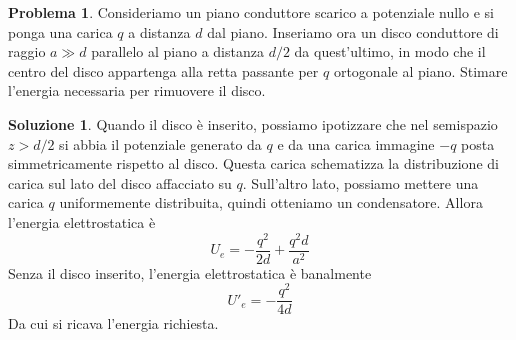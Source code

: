\documentclass[a4paper,11pt]{book}
\theoremstyle{theorem}
\theoremstyle{definition}
\newtheorem{problema}{Problema}[section]
\newtheorem{soluzione}{Soluzione}[section]
\begin{document}
\begin{problema}
	Consideriamo un piano conduttore scarico a potenziale nullo e si ponga una carica $q$ a distanza $d$ dal piano. Inseriamo ora un disco conduttore di raggio $a\gg d$ parallelo al piano a distanza $d/2$ da quest'ultimo, in modo che il centro del disco appartenga alla retta passante per $q$ ortogonale al piano. Stimare l'energia necessaria per rimuovere il disco.
\end{problema}
\begin{soluzione}
	Quando il disco è inserito, possiamo ipotizzare che nel semispazio $z>d/2$ si abbia il potenziale generato da $q$ e da una carica immagine $-q$ posta simmetricamente rispetto al disco. Questa carica schematizza la distribuzione di carica sul lato del disco affacciato su $q$. Sull'altro lato, possiamo mettere una carica $q$ uniformemente distribuita, quindi otteniamo un condensatore. Allora l'energia elettrostatica è
	\[U_e=-\frac{q^2}{2d}+\frac{q^2d}{a^2}\]
	Senza il disco inserito, l'energia elettrostatica è banalmente
	\[U'_e=-\frac{q^2}{4d}\]
	Da cui si ricava l'energia richiesta.
\end{soluzione}
\newpage
\end{document}
